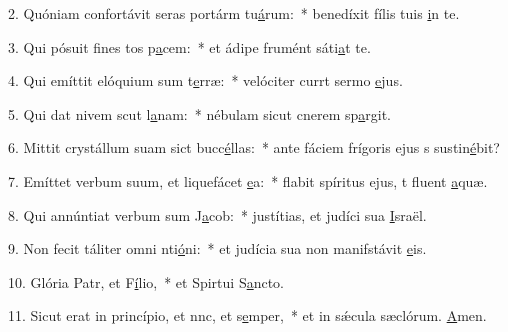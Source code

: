 2. Quóniam confortávit seras portárm tu\uline{á}rum:~* benedíxit fílis tuis \uline{i}n te.\par 
3. Qui pósuit fines tos p\uline{a}cem:~* et ádipe frumént sáti\uline{a}t te.\par 
4. Qui emíttit elóquium sum t\uline{e}rræ:~* velóciter currt sermo \uline{e}jus.\par 
5. Qui dat nivem scut l\uline{a}nam:~* nébulam sicut cnerem sp\uline{a}rgit.\par 
6. Mittit crystállum suam sict bucc\uline{é}llas:~* ante fáciem frígoris ejus s sustin\uline{é}bit?\par 
7. Emíttet verbum suum, et liquefácet \uline{e}a:~* flabit spíritus ejus, t fluent \uline{a}quæ.\par 
8. Qui annúntiat verbum sum J\uline{a}cob:~* justítias, et judíci sua \uline{I}sraël.\par 
9. Non fecit táliter omni nti\uline{ó}ni:~* et judícia sua non manifstávit \uline{e}is.\par 
10. Glória Patr, et F\uline{í}lio,~* et Spirtui S\uline{a}ncto.\par 
11. Sicut erat in princípio, et nnc, et s\uline{e}mper,~* et in sǽcula sæclórum. \uline{A}men.\par 
